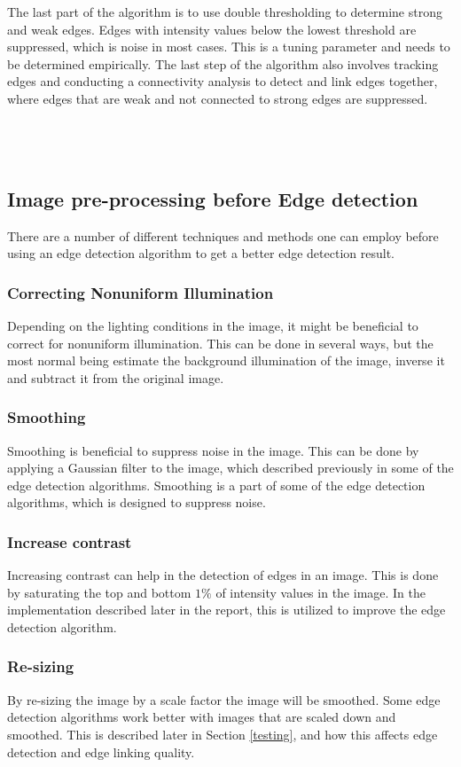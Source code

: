 The last part of the algorithm is to use double thresholding to determine strong and weak edges. Edges with intensity values below the lowest threshold are suppressed, which is noise in most cases. This is a tuning parameter and needs to be determined empirically. The last step of the algorithm also involves tracking edges and conducting a connectivity analysis to detect and link edges together, where edges that are weak and not connected to strong edges are suppressed.\\
\\
\\
\\

\subsection{Image pre-processing before Edge detection}
There are a number of different techniques and methods one can employ before using an edge detection algorithm to get a better edge detection result.
\subsubsection{Correcting Nonuniform Illumination}
Depending on the lighting conditions in the image, it might be beneficial to correct for nonuniform illumination. This can be done in several ways, but the most normal being estimate the background illumination of the image, inverse it and subtract it from the original image.
\subsubsection{Smoothing}
Smoothing is beneficial to suppress noise in the image. This can be done by applying a Gaussian filter to the image, which described previously in some of the edge detection algorithms. Smoothing is a part of some of the edge detection algorithms, which is designed to suppress noise.
\subsubsection{Increase contrast}
Increasing contrast can help in the detection of edges in an image. This is done by saturating the top and bottom $1\%$ of intensity values in the image. In the implementation described later in the report, this is utilized to improve the edge detection algorithm.
\subsubsection{Re-sizing}
By re-sizing the image by a scale factor the image will be smoothed. Some edge detection algorithms work better with images that are scaled down and smoothed. This is described later in Section \ref{testing}, and how this affects edge detection and edge linking quality.

